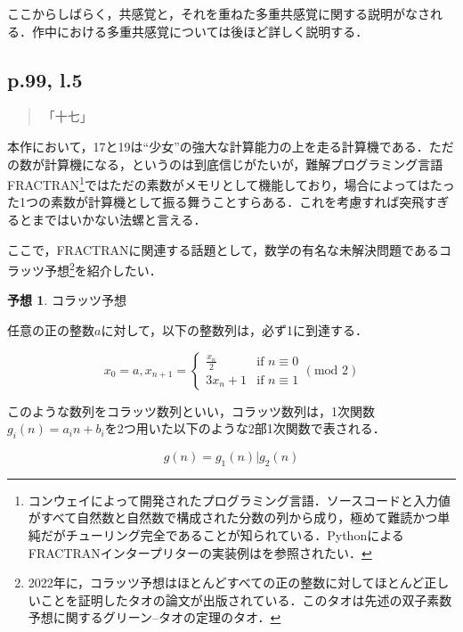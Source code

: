 \documentclass[10pt, a5paper, twoside]{jsarticle}
\theoremstyle{definition}
\newtheorem{hyp}{予想}
\begin{document}
			ここからしばらく，共感覚と，それを重ねた多重共感覚に関する説明がなされる．作中における多重共感覚については後ほど詳しく説明する．

		\subsection{p.99, l.5}

			\begin{quote}

				「十七」

			\end{quote}

			本作において，17と19は“少女”の強大な計算能力の上を走る計算機である．ただの数が計算機になる，というのは到底信じがたいが，難解プログラミング言語FRACTRAN\footnote{コンウェイによって開発されたプログラミング言語．ソースコードと入力値がすべて自然数と自然数で構成された分数の列から成り，極めて難読かつ単純だがチューリング完全であることが知られている．PythonによるFRACTRANインタープリターの実装例は\cite{pyfra}を参照されたい．}ではただの素数がメモリとして機能しており\cite{fra}，場合によってはたった1つの素数が計算機として振る舞うことすらある．これを考慮すれば突飛すぎるとまではいかない法螺と言える．

			ここで，FRACTRANに関連する話題として，数学の有名な未解決問題であるコラッツ予想\footnote{2022年に，コラッツ予想はほとんどすべての正の整数に対してほとんど正しいことを証明したタオの論文が出版されている．このタオは先述の双子素数予想に関するグリーン--タオの定理のタオ．}を紹介したい．

			\begin{hyp}

				コラッツ予想

				任意の正の整数$a$に対して，以下の整数列は，必ず1に到達する．

				\begin{equation*}
					x_0 = a, x_{n+1} = \begin{cases} \displaystyle \frac{x_n}{2} & \text{if~} n \equiv 0 \\ 3 x_n + 1 & \text{if~} n \equiv 1 \end{cases} (\text{mod~}2)
				\end{equation*}
				
			\end{hyp}

			このような数列をコラッツ数列といい，コラッツ数列は，1次関数$g_i(n) = a_i n + b_i$を2つ用いた以下のような2部1次関数で表される．

			$$g(n) = g_1(n) | g_2(n)$$
\end{document}
